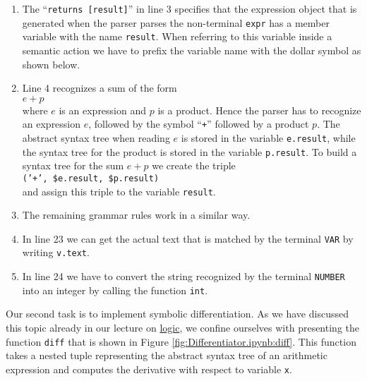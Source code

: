 \begin{enumerate}
\item The  ``\texttt{returns [result]}'' in line 3 specifies
      that the expression object that is generated when the parser parses the non-terminal \texttt{expr}
      has a member variable with the name \texttt{result}.  When referring to this variable inside a semantic
      action we have to prefix the variable name with the dollar symbol as shown below.
\item Line 4 recognizes a sum of the form
      \\[0.2cm]
      \hspace*{1.3cm}
      $e + p$
      \\[0.2cm]
      where $e$ is an expression and $p$ is a product.
      Hence the parser has to recognize an expression $e$, followed by the symbol ``\texttt{+}'' followed by a
      product $p$.  The abstract syntax tree when reading $e$ is stored in the variable 
      \texttt{e.result}, while the syntax tree for the product is stored in the variable
      \texttt{p.result}.  To build a syntax tree for the sum $e + p$ we create the triple
      \\[0.2cm]
      \hspace*{1.3cm}
      \texttt{('+', \$e.result, \$p.result)}
      \\[0.2cm]
      and assign this triple to the variable \texttt{result}.
\item The remaining grammar rules work in a similar way.
\item In line 23 we can get the actual text that is matched by the terminal \texttt{VAR} by writing 
      \texttt{v.text}.
\item In line 24 we have to convert the string recognized by the terminal \texttt{NUMBER} into an integer
      by calling the function \texttt{int}.
\end{enumerate}

Our second task is to implement symbolic differentiation.  As we have discussed this topic already in 
our lecture on \href{https://github.com/karlstroetmann/Logic/blob/master/Lecture-Notes/logic.pdf}{logic},
we confine ourselves with presenting the function \texttt{diff} that is shown in Figure
\ref{fig:Differentiator.ipynb:diff}.  This function takes a nested tuple representing the abstract syntax tree 
of an arithmetic expression and computes the derivative with respect to variable \texttt{x}.

